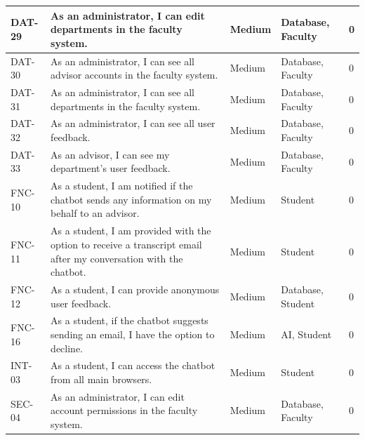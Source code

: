 \documentclass[titlepage, 12pt]{article}
\begin{document}
\begin{center}
\begin{longtable}{ L{1.5cm} L{4cm} L{1.5cm} L{3cm} L{1.5cm} }
        \midrule
        DAT-29 & As an administrator, I can edit departments in the faculty system.                                                                & Medium & Database, Faculty    & 0            \\
        \midrule
        DAT-30 & As an administrator, I can see all advisor accounts in the faculty system.                                                        & Medium & Database, Faculty    & 0              \\
        \midrule
        DAT-31 & As an administrator, I can see all departments in the faculty system.                                                             & Medium & Database, Faculty    & 0          \\
        \midrule
        DAT-32 & As an administrator, I can see all user feedback.                                                                                 & Medium & Database, Faculty    & 0         \\
        \midrule
        DAT-33 & As an advisor, I can see my department's user feedback.                                                                           & Medium & Database, Faculty    & 0       \\
        \midrule
        FNC-10 & As a student, I am notified if the chatbot sends any information on my behalf to an advisor.                                      & Medium & Student             & 0     \\
        \midrule
        FNC-11 & As a student, I am provided with the option to receive a transcript email after my conversation with the chatbot.                 & Medium & Student             & 0    \\
        \midrule
        FNC-12 & As a student, I can provide anonymous user feedback.                                                                              & Medium & Database, Student    & 0     \\
        \midrule
        FNC-16 & As a student, if the chatbot suggests sending an email, I have the option to decline.                                             & Medium & AI, Student          & 0       \\
        \midrule
        INT-03 & As a student, I can access the chatbot from all main browsers.                                                                    & Medium & Student             & 0        \\
        \midrule
        SEC-04 & As an administrator, I can edit account permissions in the faculty system.                                                        & Medium & Database, Faculty    & 0         \\

\end{longtable}
\end{center}
\end{document}
